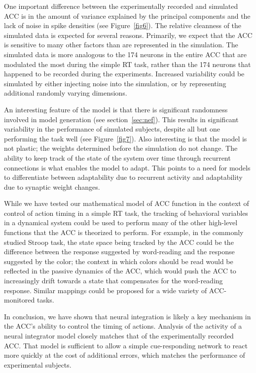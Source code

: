 \documentclass[11pt]{article}
\begin{document}
One important difference between
the experimentally recorded and simulated ACC
is in the amount of variance
explained by the principal components
and the lack of noise in
spike densities (see Figure~\ref{fig6}).
The relative cleanness of the simulated data
is expected for several reasons.
Primarily, we expect that the ACC
is sensitive to many other factors
than are represented in the simulation.
The simulated data is more analogous
to the 174 neurons in the entire ACC
that are modulated the most during the simple RT task,
rather than the 174 neurons that happened
to be recorded during the experiments.
Increased variability could be simulated
by either injecting
noise into the simulation,
or by representing additional
randomly varying dimensions.

An interesting feature of the model
is that there is significant randomness
involved in model generation (see section~\ref{sec:nef}).
This results in significant variability
in the performance of simulated subjects,
despite all but one performing the task well
(see Figure~\ref{fig7}).
Also interesting is that the model is
not plastic; the weights determined
before the simulation do not change.
The ability to keep track of the state
of the system over time through recurrent connections
is what enables the model to adapt.
This points to a need for models to
differentiate between adaptability
due to recurrent activity
and adaptability due to
synaptic weight changes.

While we have tested our mathematical model
of ACC function in the context of
control of action timing in a simple RT task,
the tracking of behavioral variables
in a dynamical system could be used
to perform many of the other high-level functions
that the ACC is theorized to perform.
For example, in the commonly studied Stroop task,
the state space being tracked by
the ACC could be the difference between
the response suggested by word-reading and the
response suggested by the color;
the context in which colors should be read
would be reflected in the passive dynamics
of the ACC, which would push the ACC
to increasingly drift towards a state
that compensates for the word-reading response.
Similar mappings could be proposed
for a wide variety of ACC-monitored tasks.

In conclusion, we have shown that neural integration
is likely a key mechanism in the ACC's
ability to control the timing of actions.
Analysis of the activity of a neural integrator
model closely matches that of the experimentally recorded ACC.
That model is sufficient to allow
a simple cue-responding network
to react more quickly at the cost
of additional errors,
which matches the performance of experimental subjects.
\end{document}
